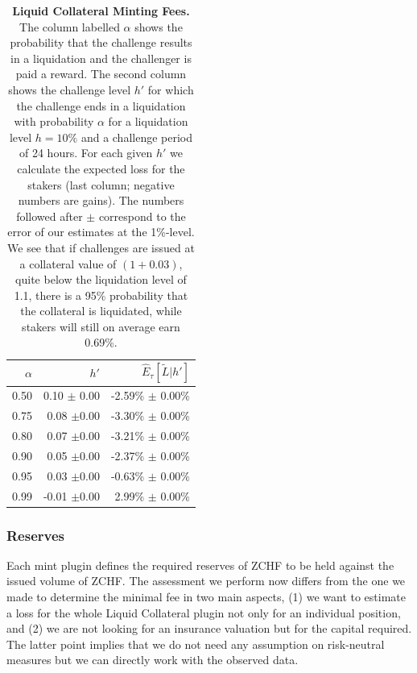 \documentclass[english,11pt]{article}
\begin{document}
\begin{table}[h]
\caption{\textbf{Liquid Collateral Minting Fees.} The column labelled $\alpha$ shows the probability
that the challenge results in a liquidation and the challenger is paid a reward.
The second column shows the challenge level $h'$ for which the challenge ends in a
liquidation with probability $\alpha$ for a liquidation level $h=10\%$ and a challenge
period of 24 hours. For each given $h'$ we calculate the expected loss for the stakers
(last column; negative numbers are gains).
The numbers followed after $\pm$ correspond to the error of our estimates at the 1\%-level.
We see that if challenges are issued at a collateral value of $(1+0.03)$, quite below the 
liquidation level of 1.1, there is
a 95\% probability that the collateral is liquidated, while stakers will still on average
earn 0.69\%.\label{tab:calibration}}
\center
\begin{tabular}{rrr}
\toprule
\textbf{$\alpha$} & \textbf{$h'$}   & \textbf{$\hat{E}_{\tau}\left[\tilde{L} | h' \right]$}\\
\midrule
0.50                           & 0.10 $\pm$ 0.00 & -2.59\% $\pm$ 0.00\% \\
0.75                           & 0.08 $\pm$0.00  & -3.30\% $\pm$ 0.00\% \\
0.80                           & 0.07 $\pm$0.00  & -3.21\% $\pm$ 0.00\% \\
0.90                           & 0.05 $\pm$0.00  & -2.37\% $\pm$ 0.00\% \\
0.95                           & 0.03 $\pm$0.00  & -0.63\% $\pm$ 0.00\% \\
0.99                           & -0.01 $\pm$0.00 & 2.99\% $\pm$ 0.00\% \\
\bottomrule
\end{tabular}
\end{table}

\clearpage
\subsubsection{Reserves}
Each mint plugin defines the required reserves of ZCHF to be held against
the issued volume of ZCHF. The assessment we perform now differs from the one we made
to determine the minimal fee in two main aspects, (1) we want to estimate a loss for
the whole Liquid Collateral plugin not only for an individual position, and (2) we
are not looking for an insurance valuation but for the capital required.
The latter point implies that we do not need any assumption on risk-neutral measures
but we can directly work with the observed data.
\end{document}
